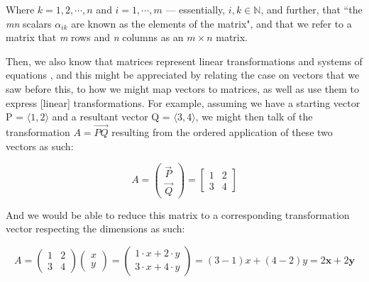 \documentclass[a4paper, 18pt]{book} %
\begin{document}
\begin{appendices}
\vspace{2em}

Where $k = 1, 2, \cdots, n$ and $i = 1, \cdots, m$ --- essentially, $i, k \in \mathbb{N}$, and further, that ``the \textit{mn} scalars $\alpha_{ik}$ are known as the elements of the matrix", and that we refer to a matrix that \textit{m} rows and \textit{n} columns as an $m \times n$ matrix.

\vspace{2em}

Then, we also know that matrices represent linear transformations and systems of equations \cite{strang2016introduction}\cite{nef1967linear}, and this might be appreciated by relating the case on vectors that we saw before this, to how we might map vectors to matrices, as well as use them to express [linear] transformations. For example, assuming we have a starting vector P = $\langle 1, 2 \rangle$ and a resultant vector Q = $\langle 3, 4 \rangle$, we might then talk of the transformation $A = \overset{\rightarrow}{PQ}$ resulting from the ordered application of these two vectors as such:

\vspace{2em}

\[ A = \begin{pmatrix} \overset{\rightarrow}{P} \\ \overset{\rightarrow}{Q} \end{pmatrix} = \begin{bmatrix} 1 & 2 \\ 3 & 4 \end{bmatrix} \]

\vspace{2em}

And we would be able to reduce this matrix to a corresponding transformation vector respecting the dimensions as such:

\[ A = \begin{pmatrix} 1 & 2 \\ 3 & 4 \end{pmatrix} \begin{pmatrix} x \\ y \end{pmatrix} = \begin{pmatrix} 1\cdot x + 2\cdot y \\ 3\cdot x + 4\cdot y \end{pmatrix} = (3-1)x + (4-2)y  = 2\textbf{x} + 2\textbf{y}\]

\vspace{2em}


\end{appendices}
\end{document}
